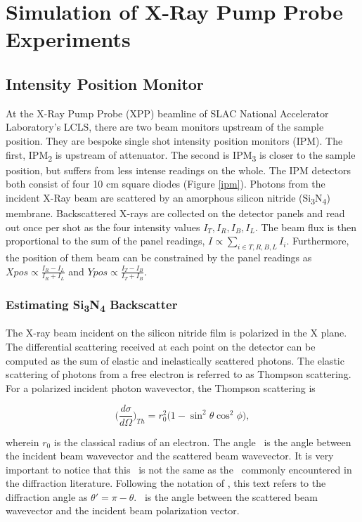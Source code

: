 \documentclass{report}
\begin{document}
\chapter{Simulation of X-Ray Pump Probe Experiments}

\section{Intensity Position Monitor}
At the X-Ray Pump Probe (XPP) beamline of SLAC National Accelerator Laboratory's LCLS, there are two beam monitors upstream of the sample position.
They are bespoke single shot intensity position monitors (IPM).
The first, IPM\textsubscript{2} is upstream of attenuator.
The second is IPM\textsubscript{3} is closer to the sample position, but suffers from less intense readings on the whole.
The IPM detectors both consist of four 10 cm square diodes (Figure \ref{ipm}).
Photons from the incident X-Ray beam are scattered by an amorphous silicon nitride (Si\textsubscript{3}N\textsubscript{4}) membrane.
Backscattered X-rays are collected on the detector panels and read out once per shot as the four intensity values $I_T, I_R, I_B, I_L$. 
The beam flux is then proportional to the sum of the panel readings, $I\propto \sum_{i\in T,R,B,L}I_i$. 
Furthermore, the position of them beam can be constrained by the panel readings as $Xpos\propto \frac{I_R-I_L} {I_R + I_L}$ and $Ypos\propto \frac{I_T-I_B} {I_T + I_B}$. 

\subsection{Estimating Si\textsubscript{3}N\textsubscript{4} Backscatter}
The X-ray beam incident on the silicon nitride film is polarized in the X plane. 
The differential scattering received at each point on the detector can be computed as the sum of elastic and inelastically scattered photons. 
The elastic scattering of photons from a free electron is referred to as Thompson scattering. 
For a polarized incident photon wavevector, the Thompson scattering is \cite{Hubbell1975-fl}

\begin{equation}
\bigg( \frac {d\sigma}{d\Omega} \bigg)_{Th} = r_0^2 \bigg(1 - \sin^2 \theta \cos^2 \phi \bigg),
\end{equation}



wherein $r_0$ is the classical radius of an electron. 
The angle \texttheta\ is the angle between the incident beam wavevector and the scattered beam wavevector. 
It is very important to notice that this \texttheta\ is not the same as the \texttheta\ commonly encountered in the diffraction literature.
Following the notation of \cite{Hanson1986-ta}, this text refers to the diffraction angle as $\theta'=\pi - \theta$.
\textphi\ is the angle between the scattered beam wavevector and the incident beam polarization vector. 
\end{document}
